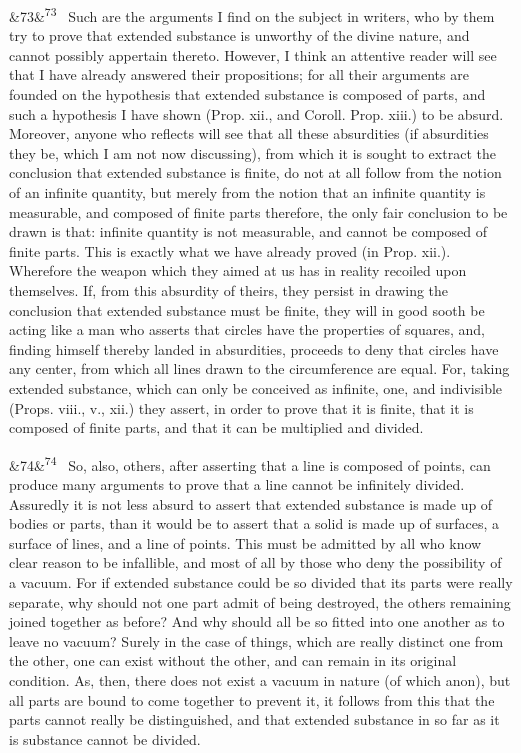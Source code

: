 \documentclass[12pt]{article}
\newcommand{\para}[1][]{\par\noindent\ifx&#1&\else\textsuperscript{\footnotesize #1}~\fi}
\begin{document}
\para[73] Such are the arguments I find on the subject in writers, who by them try to prove that extended substance is unworthy of the divine nature, and cannot possibly appertain thereto. However, I think an attentive reader will see that I have already answered their propositions; for all their arguments are founded on the hypothesis that extended substance is composed of parts, and such a hypothesis I have shown (Prop. xii., and Coroll. Prop. xiii.) to be absurd. Moreover, anyone who reflects will see that all these absurdities (if absurdities they be, which I am not now discussing), from which it is sought to extract the conclusion that extended substance is finite, do not at all follow from the notion of an infinite quantity, but merely from the notion that an infinite quantity is measurable, and composed of finite parts therefore, the only fair conclusion to be drawn is that: infinite quantity is not measurable, and cannot be composed of finite parts. This is exactly what we have already proved (in Prop. xii.). Wherefore the weapon which they aimed at us has in reality recoiled upon themselves. If, from this absurdity of theirs, they persist in drawing the conclusion that extended substance must be finite, they will in good sooth be acting like a man who asserts that circles have the properties of squares, and, finding himself thereby landed in absurdities, proceeds to deny that circles have any center, from which all lines drawn to the circumference are equal. For, taking extended substance, which can only be conceived as infinite, one, and indivisible (Props. viii., v., xii.) they assert, in order to prove that it is finite, that it is composed of finite parts, and that it can be multiplied and divided.

\para[74] So, also, others, after asserting that a line is composed of points, can produce many arguments to prove that a line cannot be infinitely divided. Assuredly it is not less absurd to assert that extended substance is made up of bodies or parts, than it would be to assert that a solid is made up of surfaces, a surface of lines, and a line of points. This must be admitted by all who know clear reason to be infallible, and most of all by those who deny the possibility of a vacuum. For if extended substance could be so divided that its parts were really separate, why should not one part admit of being destroyed, the others remaining joined together as before? And why should all be so fitted into one another as to leave no vacuum? Surely in the case of things, which are really distinct one from the other, one can exist without the other, and can remain in its original condition. As, then, there does not exist a vacuum in nature (of which anon), but all parts are bound to come together to prevent it, it follows from this that the parts cannot really be distinguished, and that extended substance in so far as it is substance cannot be divided.
\end{document}
